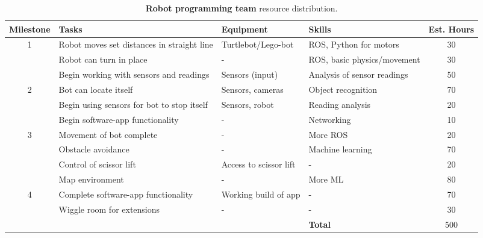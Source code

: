 \documentclass{article}
\begin{document}
\begin{table*}[]
  \begin{center}
  \begin{small}
  \begin{tabular}{|c|l|l|l|c|}
    \hline
    {\bf Milestone} & {\bf Tasks} & {\bf Equipment} & {\bf Skills} & {\bf Est. Hours} \\ \hline
    1               & Robot moves set distances in straight line & Turtlebot/Lego-bot & ROS, Python for motors & 30\\ \cline{2-5}
                    & Robot can turn in place & - & ROS, basic physics/movement & 30\\ \cline{2-5}
                    & Begin working with sensors and readings & Sensors (input) & Analysis of sensor readings & 50 \\ \hline
    2               & Bot can locate itself & Sensors, cameras & Object recognition & 70\\ \cline{2-5}
                    & Begin using sensors for bot to stop itself & Sensors, robot & Reading analysis & 20\\ \cline{2-5}
                    & Begin software-app functionality & - & Networking & 10\\ \hline
    3               & Movement of bot complete & - & More ROS & 20\\ \cline{2-5}
                    & Obstacle avoidance & - & Machine learning & 70\\ \cline{2-5}
                    & Control of scissor lift & Access to scissor lift & - & 20\\ \cline{2-5}
                    & Map environment & - & More ML & 80\\ \hline
    4               & Complete software-app functionality & Working build of app & - & 70\\ \cline{2-5}
                    & Wiggle room for extensions & - & - & 30\\ \hline
                    &  &  & {\bf Total} & 500 \\ \hline
  \end{tabular}
  \end{small}
  \caption{{\bf Robot programming team} resource distribution.}
  \label{tab:rp-rd}
  \end{center}
\end{table*}
\end{document}
